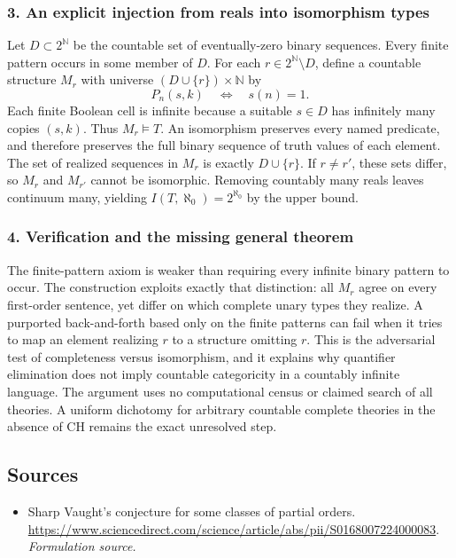 \documentclass[11pt]{article}
\begin{document}
\subsubsection{3. An explicit injection from reals into isomorphism types}
Let $D\subset2^{\mathbb N}$ be the countable set of eventually-zero binary sequences. Every finite pattern occurs in some member of $D$. For each $r\in2^{\mathbb N}\setminus D$, define a countable structure $M_r$ with universe $(D\cup\{r\})\times\mathbb N$ by
\[P_n(s,k)\quad\Longleftrightarrow\quad s(n)=1.\]
Each finite Boolean cell is infinite because a suitable $s\in D$ has infinitely many copies $(s,k)$. Thus $M_r\models T$. An isomorphism preserves every named predicate, and therefore preserves the full binary sequence of truth values of each element. The set of realized sequences in $M_r$ is exactly $D\cup\{r\}$. If $r\ne r'$, these sets differ, so $M_r$ and $M_{r'}$ cannot be isomorphic. Removing countably many reals leaves continuum many, yielding $I(T,\aleph_0)=2^{\aleph_0}$ by the upper bound.

\subsubsection{4. Verification and the missing general theorem}
The finite-pattern axiom is weaker than requiring every infinite binary pattern to occur. The construction exploits exactly that distinction: all $M_r$ agree on every first-order sentence, yet differ on which complete unary types they realize. A purported back-and-forth based only on the finite patterns can fail when it tries to map an element realizing $r$ to a structure omitting $r$. This is the adversarial test of completeness versus isomorphism, and it explains why quantifier elimination does not imply countable categoricity in a countably infinite language. The argument uses no computational census or claimed search of all theories. A uniform dichotomy for arbitrary countable complete theories in the absence of CH remains the exact unresolved step.

\subsection{Sources}
\begin{itemize}
\item[S1]Sharp Vaught's conjecture for some classes of partial orders.
\url{https://www.sciencedirect.com/science/article/abs/pii/S0168007224000083}.
\textit{Formulation source.}
\end{itemize}
\end{document}
